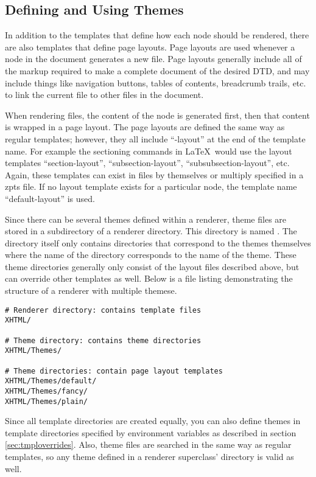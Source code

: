 \subsection{Defining and Using Themes}

In addition to the templates that define how each node should be rendered,
there are also templates that define page layouts.  Page layouts are used
whenever a node in the document generates a new file.   Page layouts 
generally include all of the markup required to make a complete document
of the desired DTD, and may include things like navigation buttons,
tables of contents, breadcrumb trails, etc. to link the current file to
other files in the document. 

When rendering files, the content of the
node is generated first, then that content is wrapped in a page layout.
The page layouts are defined the same way as regular templates; however,
they all include ``-layout'' at the end of the template name.  For 
example the sectioning commands in \LaTeX\ would use the layout templates
``section-layout'', ``subsection-layout'', ``subsubsection-layout'', etc.
Again, these templates can exist in files by themselves or multiply 
specified in a zpts file.  If no layout template exists for a particular
node, the template name ``default-layout'' is used.

Since there can be several themes defined within a renderer, theme files
are stored in a subdirectory of a renderer directory.  This directory
is named .  The  directory itself only contains
directories that correspond to the themes themselves where the name
of the directory corresponds to the name of the theme.  These theme 
directories generally only consist of the layout files described above,
but can override other templates as well.  Below is a file listing
demonstrating the structure of a renderer with multiple themese.
\begin{verbatim}
# Renderer directory: contains template files
XHTML/

# Theme directory: contains theme directories
XHTML/Themes/

# Theme directories: contain page layout templates
XHTML/Themes/default/
XHTML/Themes/fancy/
XHTML/Themes/plain/
\end{verbatim}

Since all template directories are created equally, you can also define
themes in template directories specified by environment variables as
described in section \ref{sec:tmploverrides}.  Also, theme files are 
searched in the same way as regular templates, so any theme defined
in a renderer superclass' directory is valid as well.


